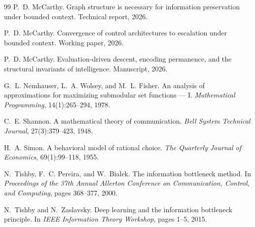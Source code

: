 \documentclass[11pt]{article}
\theoremstyle{definition}
\theoremstyle{remark}
\begin{document}
\begin{thebibliography}{99}
P.~D. McCarthy.
\newblock Graph structure is necessary for information preservation under
  bounded context.
\newblock Technical report, 2026.

P.~D. McCarthy.
\newblock Convergence of control architectures to escalation under bounded context.
\newblock Working paper, 2026.

P.~D. McCarthy.
\newblock Evaluation-driven descent, encoding permanence, and the structural
  invariants of intelligence.
\newblock Manuscript, 2026.

G.~L. Nemhauser, L.~A. Wolsey, and M.~L. Fisher.
\newblock An analysis of approximations for maximizing submodular set
  functions --- {I}.
\newblock \emph{Mathematical Programming}, 14(1):265--294, 1978.

C.~E. Shannon.
\newblock A mathematical theory of communication.
\newblock \emph{Bell System Technical Journal}, 27(3):379--423, 1948.

H.~A. Simon.
\newblock A behavioral model of rational choice.
\newblock \emph{The Quarterly Journal of Economics}, 69(1):99--118, 1955.

N.~Tishby, F.~C. Pereira, and W.~Bialek.
\newblock The information bottleneck method.
\newblock In \emph{Proceedings of the 37th Annual Allerton Conference on
  Communication, Control, and Computing}, pages 368--377, 2000.

N.~Tishby and N.~Zaslavsky.
\newblock Deep learning and the information bottleneck principle.
\newblock In \emph{IEEE Information Theory Workshop}, pages 1--5, 2015.

\end{thebibliography}
\end{document}

